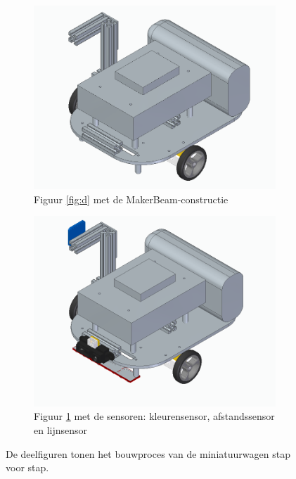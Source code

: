 \documentclass[a4paper,kulak]{kulakarticle}
\begin{document}
\begin{figure}
\begin{subfigure}[b]{0.475\textwidth}
		\includegraphics[width=\textwidth]{5.PNG}
		\caption[]%
		{{\small Figuur \ref{fig:d} met de MakerBeam-constructie}}    
		\label{fig:e}
	\end{subfigure}
	\hfill
	\begin{subfigure}[b]{0.475\textwidth}   
		\centering 
		\includegraphics[width=\textwidth]{6.PNG}
		\caption[]%
		{{\small Figuur \ref{fig:e} met de sensoren: kleurensensor, afstandssensor en lijnsensor}}    
		\label{fig:f}
	\end{subfigure}
	\caption
	{\small De deelfiguren tonen het bouwproces van de miniatuurwagen stap voor stap.} 
	\label{fig:deelfiguren}
\end{figure}
\end{document}
